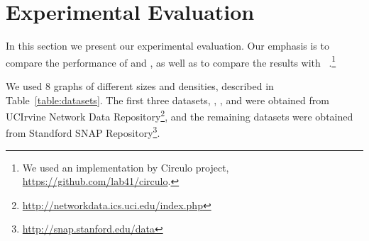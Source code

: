\section{Experimental Evaluation}
\label{sec:exp}

In this section we present our experimental evaluation.  Our emphasis is to
compare the performance of \alggreedy and \algiterative, as well as to compare
the results with \algrolx~\cite{henderson2012rolx}.\footnote{We used an implementation by Circulo project, \url{https://github.com/lab41/circulo}.}


We used 8 graphs of different sizes and densities, described in Table~\ref{table:datasets}.
The first three datasets, \karate, \dolphins, and \lesmis were obtained from UCIrvine Network Data
Repository\footnote{\url{http://networkdata.ics.uci.edu/index.php}}, and the
remaining datasets were obtained from Standford SNAP
Repository\footnote{\url{http://snap.stanford.edu/data}}.
\iffalse
\begin{itemize}
\item {\karate:} a social network of friendships between members of karate club at a US university in 1970.
\item {\dolphins:}  a social network of frequent associations between dolphins in a community living off Doubtful Sound in New Zealand.
\item {\lesmis:} co-appearance of characters in Les Miserables novel by Victor Hugo.
\item {\facebook:} friends list of Facebook users.
\item {\enron:} an e-mail communication network by Enron employees.
\item {\EUall:} an e-mail network from a EU research institution.
\item {\dblp:} a co-authorship network among computer science researchers.
\item {\youtube:} Youtube users network.
\end{itemize}
\fi

